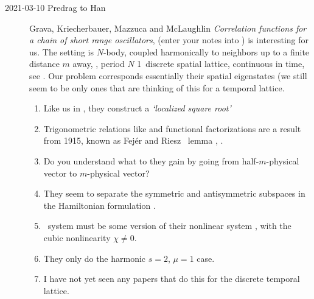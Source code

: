 \begin{description}
    \item[2021-03-10 Predrag to Han]
Grava, Kriecherbauer,  Mazzuca and McLaughlin
{\em Correlation functions for a chain of short range oscillators},
 (enter your notes into
) is interesting for us.
The setting is $N$-body, coupled harmonically  to neighbors up to a
finite distance $m$ away, \ie, period $N$ 1\dmn\ discrete spatial
lattice,  continuous in time, see . Our problem
corresponds essentially their spatial eigenstates (we still seem to be
only ones that are thinking of this for a temporal lattice.
\begin{enumerate}
  \item
Like us in , they construct a
{\em `localized square root'} 
  \item
Trigonometric relations like 
and functional factorizations are a result from
1915, known as Fej\'er and Riesz~\cite[pg.~117 f]{RieSzo55} lemma
, .
  \item
Do you understand what to they gain by  going
from half-$m$-physical vector to $m$-physical vector?
  \item
They seem to separate the symmetric and antisymmetric subspaces in the
Hamiltonian formulation .
  \item
\Henon\ system must be some version of their nonlinear system
, with the cubic nonlinearity $\chi\neq 0$.
  \item
They only do the harmonic $s=2$, $\mu=1$ case.
  \item
I have not yet seen any papers that do this for the discrete temporal
lattice.
\end{enumerate}


\end{description}
